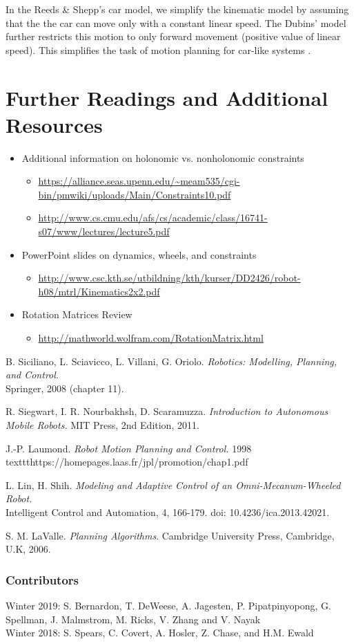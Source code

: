 \documentclass[twoside]{article}
\begin{document}
In the Reeds & Shepp's car model, we simplify the kinematic model by assuming that the the car can move only with a constant linear speed. The Dubins' model further restricts this motion to only forward movement (positive value of linear speed). This simplifies the task of motion planning for car-like systems \cite{lavalle}.

\section*{Further Readings and Additional Resources}

\begin{itemize}
   \item  Additional information on holonomic vs. nonholonomic constraints
   \begin{itemize}
     \item  \url{https://alliance.seas.upenn.edu/~meam535/cgi-bin/pmwiki/uploads/Main/Constraints10.pdf}
     \item \url{http://www.cs.cmu.edu/afs/cs/academic/class/16741-s07/www/lectures/lecture5.pdf}
   \end{itemize}
   \item PowerPoint slides on dynamics, wheels, and constraints
   \begin{itemize}
     \item  \url{http://www.csc.kth.se/utbildning/kth/kurser/DD2426/robot-h08/mtrl/Kinematics2x2.pdf}
   \end{itemize}
   \item Rotation Matrices Review
   \begin{itemize}
       \item \url{http://mathworld.wolfram.com/RotationMatrix.html}
   \end{itemize}
 \end{itemize}


\begin{thebibliography}{9}

B. Siciliano, L. Sciavicco, L. Villani, G. Oriolo.\textit{ Robotics: Modelling, Planning, and Control.} \\Springer, 2008 (chapter 11).

R. Siegwart, I. R. Nourbakhsh, D. Scaramuzza. \textit{Introduction to Autonomous Mobile Robots.} MIT Press, 2nd Edition, 2011.

J.-P. Laumond. \textit{Robot Motion Planning and Control.} 1998 \\texttt{https://homepages.laas.fr/jpl/promotion/chap1.pdf}

L. Lin, H. Shih. \textit{Modeling and Adaptive Control of an Omni-Mecanum-Wheeled Robot.} \\Intelligent Control and Automation, 4, 166-179. doi: 10.4236/ica.2013.42021.

S. M. LaValle. \textit{Planning Algorithms}. Cambridge University Press, Cambridge, U.K, 2006.


\end{thebibliography}

\subsubsection*{Contributors}
Winter 2019: S. Bernardon, T. DeWeese,  A. Jagesten, P. Pipatpinyopong, G. Spellman, J. Malmstrom, M. Ricks, V. Zhang and V. Nayak
\\
Winter 2018: S. Spears, C. Covert, A. Hosler, Z. Chase, and H.M. Ewald
\end{document}

